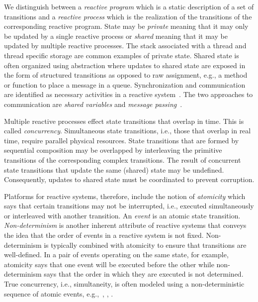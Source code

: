 We distinguish between a \emph{reactive program} which is a static description of a set of transitions and a \emph{reactive process} which is the realization of the transitions of the corresponding reactive program.
State may be \emph{private} meaning that it may only be updated by a single reactive process or \emph{shared} meaning that it may be updated by multiple reactive processes.
The stack associated with a thread and thread specific storage are common examples of private state.
Shared state is often organized using abstraction where updates to shared state are exposed in the form of structured transitions as opposed to raw assignment, e.g., a method or function to place a message in a queue.
Synchronization and communication are identified as necessary activities in a reactive system~\cite{andrews1983concepts}.
The two approaches to communication are \emph{shared variables} and \emph{message passing}~\cite{andrews1983concepts}.

Multiple reactive processes effect state transitions that overlap in time.
This is called \emph{concurrency}.
Simultaneous state transitions, i.e., those that overlap in real time, require parallel physical resources.
State transitions that are formed by sequential composition may be overlapped by interleaving the primitive transitions of the corresponding complex transitions.
The result of concurrent state transitions that update the same (shared) state may be undefined.
Consequently, updates to shared state must be coordinated to prevent corruption.

Platforms for reactive systems, therefore, include the notion of \emph{atomicity} which says that certain transitions may not be interrupted, i.e., executed simultaneously or interleaved with another transition.
An \emph{event} is an atomic state transition.
\emph{Non-determinism} is another inherent attribute of reactive systems that conveys the idea that the order of events in a reactive system is not fixed.
Non-determinism is typically combined with atomicity to ensure that transitions are well-defined.
In a pair of events operating on the same state, for example, atomicity says that one event will be executed before the other while non-determinism says that the order in which they are executed is not determined.
True concurrency, i.e., simultaneity, is often modeled using a non-deterministic sequence of atomic events, e.g.,~\cite{nancy1996distributed}, \cite{chandy1989parallel}, \cite{manna1992temporal}.

